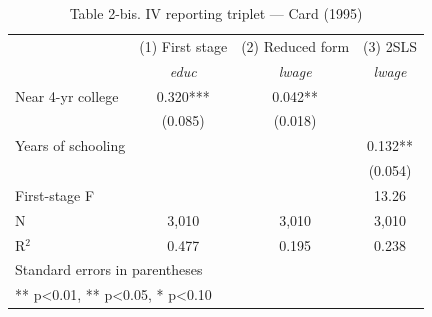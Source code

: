 \begin{table}[htbp]
\centering
\caption{Table 2-bis. IV reporting triplet — Card (1995)}
\begin{tabular}{lccc}
\hline\hline
 & (1) First stage & (2) Reduced form & (3) 2SLS \\
 & \textit{educ} & \textit{lwage} & \textit{lwage} \\
\hline
Near 4-yr college & 0.320*** & 0.042** &  \\
 & (0.085) & (0.018) &  \\
Years of schooling &  &  & 0.132** \\
 &  &  & (0.054) \\
\hline
First-stage F &  &  & 13.26 \\
\hline
N & 3,010 & 3,010 & 3,010 \\
R$^2$ & 0.477 & 0.195 & 0.238 \\
\hline\hline
\multicolumn{4}{l}{\footnotesize Standard errors in parentheses} \\
\multicolumn{4}{l}{\footnotesize *** p<0.01, ** p<0.05, * p<0.10} \\
\end{tabular}
\end{table}